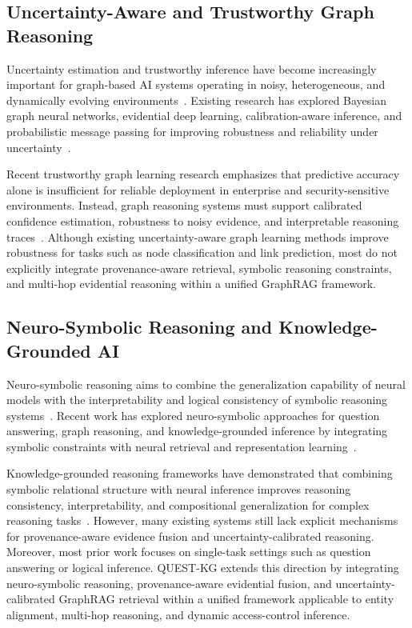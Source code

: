 \documentclass[sigconf,review,anonymous]{acmart}
\begin{document}
\subsection{Uncertainty-Aware and Trustworthy Graph Reasoning}

Uncertainty estimation and trustworthy inference have become increasingly important for graph-based AI systems operating in noisy, heterogeneous, and dynamically evolving environments~\cite{chen2023trustworthy}. Existing research has explored Bayesian graph neural networks, evidential deep learning, calibration-aware inference, and probabilistic message passing for improving robustness and reliability under uncertainty~\cite{sensoy2018evidential,amini2020deep}. 

Recent trustworthy graph learning research emphasizes that predictive accuracy alone is insufficient for reliable deployment in enterprise and security-sensitive environments. Instead, graph reasoning systems must support calibrated confidence estimation, robustness to noisy evidence, and interpretable reasoning traces~\cite{liu2022trustworthy}. Although existing uncertainty-aware graph learning methods improve robustness for tasks such as node classification and link prediction, most do not explicitly integrate provenance-aware retrieval, symbolic reasoning constraints, and multi-hop evidential reasoning within a unified GraphRAG framework.

\subsection{Neuro-Symbolic Reasoning and Knowledge-Grounded AI}

Neuro-symbolic reasoning aims to combine the generalization capability of neural models with the interpretability and logical consistency of symbolic reasoning systems~\cite{garcez2019neural}. Recent work has explored neuro-symbolic approaches for question answering, graph reasoning, and knowledge-grounded inference by integrating symbolic constraints with neural retrieval and representation learning~\cite{mao2019neuro}. 

Knowledge-grounded reasoning frameworks have demonstrated that combining symbolic relational structure with neural inference improves reasoning consistency, interpretability, and compositional generalization for complex reasoning tasks~\cite{yao2021kagnn}. However, many existing systems still lack explicit mechanisms for provenance-aware evidence fusion and uncertainty-calibrated reasoning. Moreover, most prior work focuses on single-task settings such as question answering or logical inference. QUEST-KG extends this direction by integrating neuro-symbolic reasoning, provenance-aware evidential fusion, and uncertainty-calibrated GraphRAG retrieval within a unified framework applicable to entity alignment, multi-hop reasoning, and dynamic access-control inference.
\end{document}
